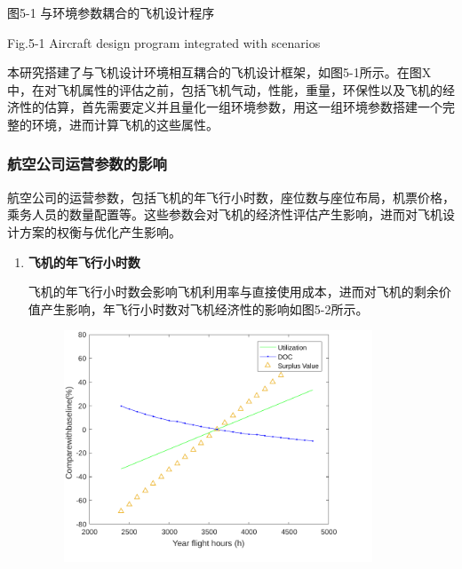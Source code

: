 \documentclass[12pt]{article}
\begin{document}
\begin{CJK*}{UTF8}{gbsn}

\par

\begin{Center}
图5-1 与环境参数耦合的飞机设计程序
\end{Center}\par

\begin{Center}
Fig.5-1 Aircraft design program integrated with scenarios
\end{Center}\par


\vspace{\baselineskip}
本研究搭建了与飞机设计环境相互耦合的飞机设计框架，如图5-1所示。在图X中，在对飞机属性的评估之前，包括飞机气动，性能，重量，环保性以及飞机的经济性的估算，首先需要定义并且量化一组环境参数，用这一组环境参数搭建一个完整的环境，进而计算飞机的这些属性。\par

\subsubsection{航空公司运营参数的影响}
航空公司的运营参数，包括飞机的年飞行小时数，座位数与座位布局，机票价格，乘务人员的数量配置等。这些参数会对飞机的经济性评估产生影响，进而对飞机设计方案的权衡与优化产生影响。\par

\begin{enumerate}
	\item \textbf{飞机的年飞行小时数}\par

飞机的年飞行小时数会影响飞机利用率与直接使用成本，进而对飞机的剩余价值产生影响，年飞行小时数对飞机经济性的影响如图5-2所示。\par




\begin{figure}[H]
	\begin{Center}
		\includegraphics[width=3.62in,height=2.71in]{./media511/image2.pdf}
	\end{Center}
\end{figure}



\end{enumerate}
\end{CJK*}
\end{document}
